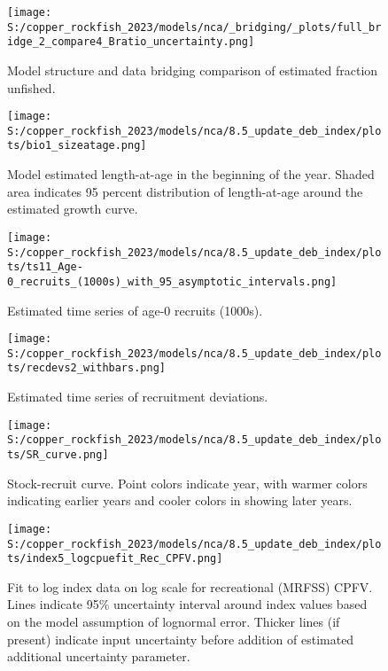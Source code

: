 \documentclass[11pt,
  english,
  letterpaper,
]{article}
\begin{document}
\begin{figure}
\centering
\texttt{[image: S:/copper\_rockfish\_2023/models/nca/\_bridging/\_plots/full\_bridge\_2\_compare4\_Bratio\_uncertainty.png]}
\caption{Model structure and data bridging comparison of estimated fraction unfished.\label{fig:data-bridge-depl-2}}
\end{figure}

\begin{figure}
\centering
\texttt{[image: S:/copper\_rockfish\_2023/models/nca/8.5\_update\_deb\_index/plots/bio1\_sizeatage.png]}
\caption{Model estimated length-at-age in the beginning of the year. Shaded area indicates 95 percent distribution of length-at-age around the estimated growth curve.\label{fig:mod-est-len-age}}
\end{figure}

\begin{figure}
\centering
\texttt{[image: S:/copper\_rockfish\_2023/models/nca/8.5\_update\_deb\_index/plots/ts11\_Age-0\_recruits\_(1000s)\_with\_95\_asymptotic\_intervals.png]}
\caption{Estimated time series of age-0 recruits (1000s).\label{fig:recruits}}
\end{figure}

\begin{figure}
\centering
\texttt{[image: S:/copper\_rockfish\_2023/models/nca/8.5\_update\_deb\_index/plots/recdevs2\_withbars.png]}
\caption{Estimated time series of recruitment deviations.\label{fig:rec-devs}}
\end{figure}

\begin{figure}
\centering
\texttt{[image: S:/copper\_rockfish\_2023/models/nca/8.5\_update\_deb\_index/plots/SR\_curve.png]}
\caption{Stock-recruit curve. Point colors indicate year, with warmer colors indicating earlier years and cooler colors in showing later years.\label{fig:bh-curve}}
\end{figure}

\begin{figure}
\centering
\texttt{[image: S:/copper\_rockfish\_2023/models/nca/8.5\_update\_deb\_index/plots/index5\_logcpuefit\_Rec\_CPFV.png]}
\caption{Fit to log index data on log scale for recreational (MRFSS) CPFV. Lines indicate 95\% uncertainty interval around index values based on the model assumption of lognormal error. Thicker lines (if present) indicate input uncertainty before addition of estimated additional uncertainty parameter.\label{fig:mrfss-cpfv-index-fit}}
\end{figure}
\end{document}
